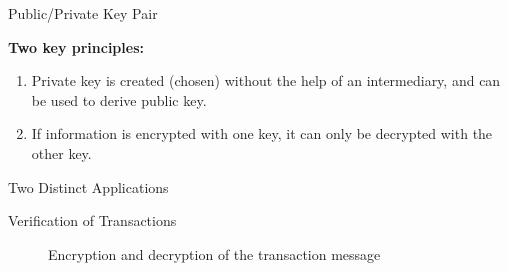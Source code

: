 \documentclass[]{beamer}
\begin{document}
\begin{frame}{Public/Private Key Pair}

	

\vspace{1em}

\textbf{Two key principles:}
\begin{enumerate}
\item<1-> Private key is created (chosen) without the help of an intermediary, and can be used to derive public key.
\item<2-> If information is encrypted with one key, it can only be decrypted with the other key.
\end{enumerate}

\vspace{1.5em}

\end{frame}

\begin{frame}{Two Distinct Applications}
	
\end{frame}


\begin{frame}{Verification of Transactions}
	\begin{figure}[h!]
		\center
		
		\caption*{Encryption and decryption of the transaction message}
		\label{fig:asymmeinfach}
	\end{figure}
	
\end{frame}
\end{document}
